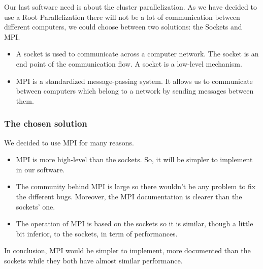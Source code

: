 Our last software need is about the cluster parallelization. As we have decided to use a Root Parallelization there will not be a lot of communication between different computers, we could choose between two solutions: the Sockets and MPI.
\begin{itemize}
\item A socket is used to communicate across a computer network. The socket is an end point of the communication flow. A socket is a low-level mechanism.
\item MPI is a standardized message-passing system. It allows us to communicate between computers which belong to a network by sending messages between them. 
\end{itemize}
\subsubsection{The chosen solution}

We decided to use MPI for many reasons.
\begin{itemize}
\item MPI is more high-level than the sockets. So, it will be simpler to implement in our software.
\item The community behind MPI is large so there wouldn't be any problem to fix the different bugs. Moreover, the MPI documentation is clearer than the sockets' one. 
\item The operation of MPI is based on the sockets so it is similar, though a little bit inferior, to the sockets, in term of performances.
\end{itemize}
In conclusion, MPI would be simpler to implement, more documented than the sockets while they both have almost similar performance.